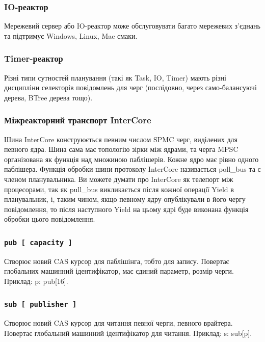 \subsubsection*{IO-реактор}
Мережевий сервер або IO-реактор може обслуговувати багато
мережевих з'єднань та підтримує Windows, Linux, Mac смаки.

\subsubsection*{Timer-реактор}
Різні типи сутностей планування (такі як Task, IO, Timer)
мають різні дисципліни селекторів повідомлень для черг
(послідовно, через само-балансуючі дерева, BTree дерева тощо).

\subsubsection{Міжреакторний транспорт InterCore}
Шина InterCore конструюється певним числом SPMC черг, виділених для певного ядра.
Шина сама має топологію зірки між ядрами, та черга MPSC організована
як функція над множиною паблішерів. Кожне ядро має рівно одного паблішера.
Функція обробки шини протоколу InterCore називається poll\_bus та є членом планувальника.
Ви можете думати про InterCore як телепорт між процесорами, так як pull\_bus
викликається після кожної операції Yield в планувальник, і, таким чином,
якщо певному ядру опублікували в його чергу повідомлення, то після наступного Yield
на цьому ядрі буде виконана функція обробки цього повідомлення.

\subsubsection*{\lstinline{pub [ capacity ]}}
Створює новий CAS курсор для паблішінга, тобто для запису.
Повертає глобальних машинний ідентифікатор, має єдиний параметр, розмір черги.
Приклад: p: pub[16].

\subsubsection*{\lstinline{sub [ publisher ]}}
Створює новий CAS курсор для читання певної черги, певного врайтера.
Повертає глобальний машинний ідентифікатор для читання.
Приклад: s: sub[p].

